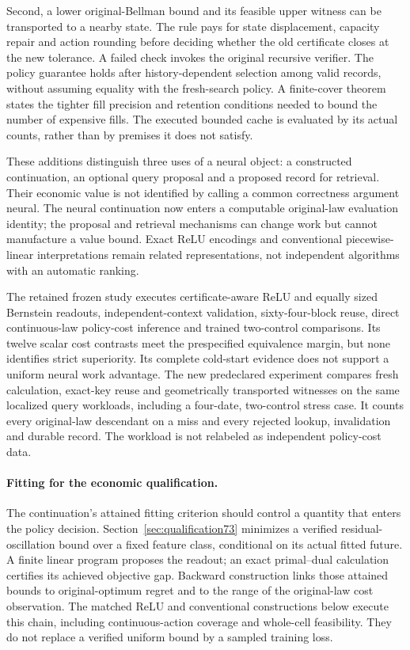 \documentclass[ecta,nameyear,draft]{econsocart}
\begin{document}
Second, a lower original-Bellman bound and its feasible upper witness can be transported to a nearby state. The rule pays for state displacement, capacity repair and action rounding before deciding whether the old certificate closes at the new tolerance. A failed check invokes the original recursive verifier. The policy guarantee holds after history-dependent selection among valid records, without assuming equality with the fresh-search policy. A finite-cover theorem states the tighter fill precision and retention conditions needed to bound the number of expensive fills. The executed bounded cache is evaluated by its actual counts, rather than by premises it does not satisfy.

These additions distinguish three uses of a neural object: a constructed continuation, an optional query proposal and a proposed record for retrieval. Their economic value is not identified by calling a common correctness argument neural. The neural continuation now enters a computable original-law evaluation identity; the proposal and retrieval mechanisms can change work but cannot manufacture a value bound. Exact ReLU encodings and conventional piecewise-linear interpretations remain related representations, not independent algorithms with an automatic ranking.

The retained frozen study executes certificate-aware ReLU and equally sized Bernstein readouts, independent-context validation, sixty-four-block reuse, direct continuous-law policy-cost inference and trained two-control comparisons. Its twelve scalar cost contrasts meet the prespecified equivalence margin, but none identifies strict superiority. Its complete cold-start evidence does not support a uniform neural work advantage. The new predeclared experiment compares fresh calculation, exact-key reuse and geometrically transported witnesses on the same localized query workloads, including a four-date, two-control stress case. It counts every original-law descendant on a miss and every rejected lookup, invalidation and durable record. The workload is not relabeled as independent policy-cost data.

\paragraph{Fitting for the economic qualification.}
The continuation's attained fitting criterion should control a quantity that enters the policy decision. Section~\ref{sec:qualification73} minimizes a verified residual-oscillation bound over a fixed feature class, conditional on its actual fitted future. A finite linear program proposes the readout; an exact primal--dual calculation certifies its achieved objective gap. Backward construction links those attained bounds to original-optimum regret and to the range of the original-law cost observation. The matched ReLU and conventional constructions below execute this chain, including continuous-action coverage and whole-cell feasibility. They do not replace a verified uniform bound by a sampled training loss.
\end{document}

